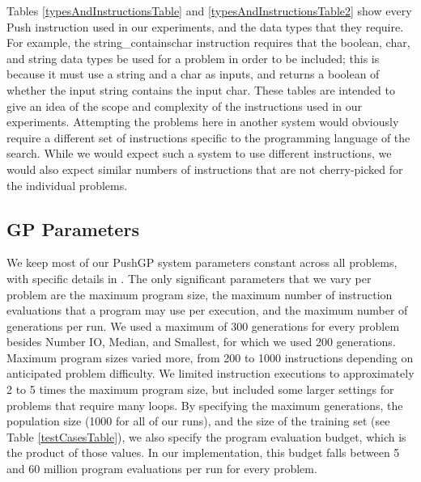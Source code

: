 \documentclass{sig-alternate}
\begin{document}
Tables \ref{typesAndInstructionsTable} and \ref{typesAndInstructionsTable2} show every Push instruction used in our experiments, and the data types that they require. For example, the string\_containschar instruction requires that the boolean, char, and string data types be used for a problem in order to be included; this is because it must use a string and a char as inputs, and returns a boolean of whether the input string contains the input char. These tables are intended to give an idea of the scope and complexity of the instructions used in our experiments. Attempting the problems here in another system would obviously require a different set of instructions specific to the programming language of the search. While we would expect such a system to use different instructions, we would also expect similar numbers of instructions that are not cherry-picked for the individual problems.


\subsection{GP Parameters}

We keep most of our PushGP system parameters constant across all problems, with specific details in \cite{helmuth:umass:tr}. The only significant parameters that we vary per problem are the maximum program size, the maximum number of instruction evaluations that a program may use per execution, and the maximum number of generations per run. We used a maximum of 300 generations for every problem besides Number IO, Median, and Smallest, for which we used 200 generations. Maximum program sizes varied more, from 200 to 1000 instructions depending on anticipated problem difficulty. We limited instruction executions to approximately 2 to 5 times the maximum program size, but included some larger settings for problems that require many loops.
By specifying the maximum generations, the population size (1000 for all of our runs), and the size of the training set (see Table \ref{testCasesTable}), we also specify the program evaluation budget, which is the product of those values. In our implementation, this budget falls between 5 and 60 million program evaluations per run for every problem. 
\end{document}
